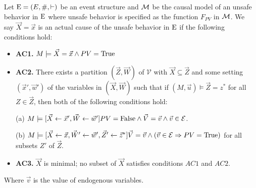\begin{definition}
    Let $\mathrm{E} = (E,\#,\vdash)$ be an event structure and
    $\mathcal{M}$ be the causal model of an unsafe behavior in
    $\mathrm{E}$ where unsafe behavior is specified as the
    function $F_{PV}$ in $\mathcal{M}$.
    We say $\vec X = \vec x$ is an actual cause of
    the unsafe behavior in $\mathrm{E}$ if the following
    conditions hold:
    \begin{itemize}
        \item  \textbf{AC1.} $M\models \vec X = \vec x
                  \wedge PV = \mathrm{True}$
        \item  \textbf{AC2. }There exists a partition $(\vec Z, \vec W)$ of $\mathcal{V}$ with $\vec X \subseteq \vec Z$ and some setting $(\vec x',\vec w')$ of the variables in $(\vec X,\vec W)$ such that if $(M,\vec u)\models \vec Z = z^*$ for all $Z\in \vec Z$, then both of the following conditions hold:

              (a) $M \models[\vec X \leftarrow \vec x', \vec W \leftarrow \vec w']
                  PV = \mathrm{False}
                  \wedge \vec V = \vec v
                  \wedge  \vec v \in \mathcal{E}$.

              (b) $M \models[\vec X\leftarrow \vec x, \vec W' \leftarrow \vec w', \vec Z'\leftarrow \vec z^*]
                  \vec V = \vec v
                  \wedge
                  (\vec v \in \mathcal{E} \Rightarrow PV = \mathrm{True})
              $
              for all subsets $Z'$ of $\vec Z$.

        \item  \textbf{AC3.} $\vec X$ is minimal; no subset of $\vec X$ satisfies conditions $AC1$ and $AC2$.
    \end{itemize}
    Where $\vec v$ is the value of endogenous variables.
\end{definition}
\pagebreak

